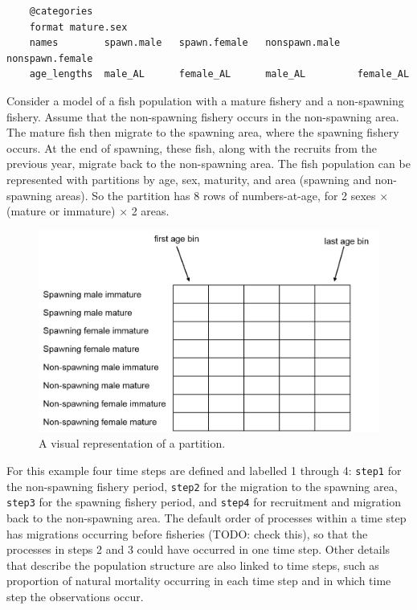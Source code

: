 {\small{\begin{verbatim}
	@categories
	format mature.sex
	names        spawn.male   spawn.female   nonspawn.male   nonspawn.female
	age_lengths  male_AL      female_AL      male_AL         female_AL
\end{verbatim}}}

Consider a model of a fish population with a mature fishery and a non-spawning fishery. Assume that the non-spawning fishery occurs in the non-spawning area. The mature fish then migrate to the spawning area, where the spawning fishery occurs. At the end of spawning, these fish, along with the recruits from the previous year, migrate back to the non-spawning area. The fish population can be represented with partitions by age, sex, maturity, and area (spawning and non-spawning areas). So the partition has 8 rows of numbers-at-age, for 2 sexes $\times$ (mature or immature) $\times$ 2 areas.

\begin{figure}[H]
	\centering
	\includegraphics[scale=0.4]{Figures/partition2.png}
		\caption{A visual representation of a partition.}\label{Fig:part}
\end{figure}

For this example four time steps are defined and labelled 1 through 4: \texttt{step1} for the non-spawning fishery period, \texttt{step2} for the migration to the spawning area, \texttt{step3} for the spawning fishery period, and \texttt{step4} for recruitment and migration back to the non-spawning area. The default order of processes within a time step has migrations occurring before fisheries (TODO: check this), so that the processes in steps 2 and 3 could have occurred in one time step. Other details that describe the population structure are also linked to time steps, such as proportion of natural mortality occurring in each time step and in which time step the observations occur.

